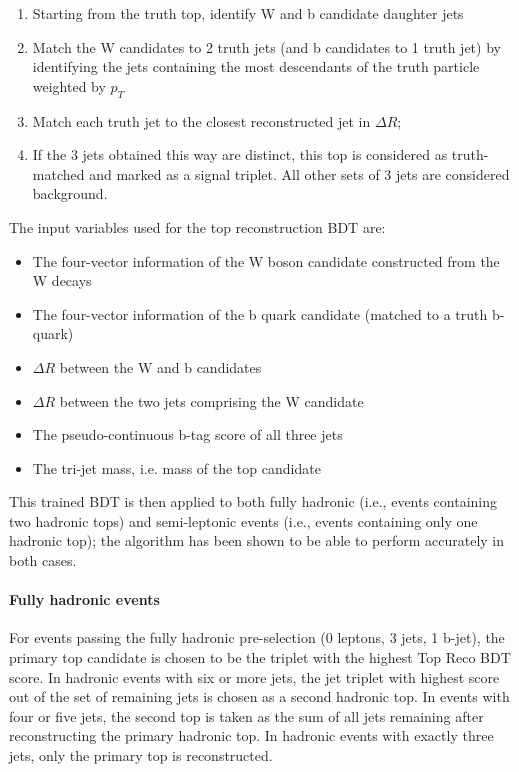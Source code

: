 \begin{enumerate}
	\item Starting from the truth top, identify W and b candidate daughter jets
	\item Match the W candidates to 2 truth jets (and b candidates to 1 truth jet) by identifying the jets containing the most descendants of the truth particle weighted by $p_{T}$
	\item Match each truth jet to the closest reconstructed jet in $\Delta R$;
	\item If the 3 jets obtained this way are distinct, this top is considered as truth-matched and marked as a signal triplet. All other sets of 3 jets are considered background.
\end{enumerate}

The input variables used for the top reconstruction BDT are:
\begin{itemize}
	\item The four-vector information of the W boson candidate constructed from the W decays
	\item The four-vector information of the b quark candidate (matched to a truth b-quark)
	\item $\Delta R$ between the W and b candidates
	\item $\Delta R$ between the two jets comprising the W candidate
	\item The pseudo-continuous b-tag score of all three jets
	\item The tri-jet mass, i.e. mass of the top candidate
\end{itemize}

This trained BDT is then applied to both fully hadronic (i.e., events containing two hadronic tops) and semi-leptonic events (i.e., events containing only one hadronic top); the algorithm has been shown to be able to perform accurately in both cases.


\paragraph{Fully hadronic events}
For events passing the fully hadronic pre-selection (0 leptons, 3 jets, 1 b-jet), the primary top candidate is chosen to be the triplet with the highest Top Reco BDT score. In hadronic events with six or more jets, the jet triplet with highest score out of the set of remaining jets is chosen as a second hadronic top. In events with four or five jets, the second top is taken as the sum of all jets remaining after reconstructing the primary hadronic top. In hadronic events with exactly three jets, only the primary top is reconstructed.



